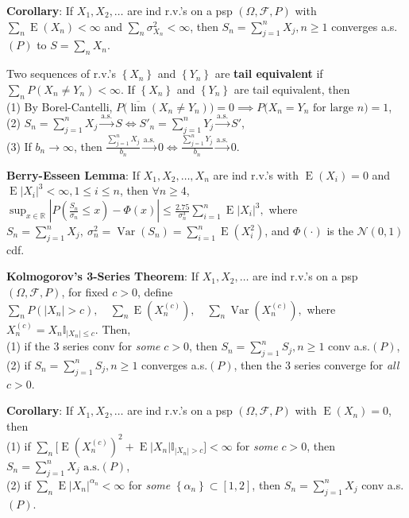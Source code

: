 \documentclass[paper=letter,fontsize=2.89mm]{scrartcl}
\DeclareMathOperator{\Var}{Var}
\DeclareMathOperator{\E}{E}
\newcommand{\convas}{\stackrel{\text{a.s.}}{\longrightarrow}}
\newcommand{\Norm}{\mathcal{N}}
\newcommand{\R}{\mathbb{R}}
\newcommand\indicate[1]{\mathbb{I}_{ #1 }}
\newcommand\abs[1]{\left| #1 \right|}
\newcommand\set[1]{\left\{ #1 \right\}}
\begin{document}
\begin{multicols*}{3}
\textbf{Corollary}: If $X_1, X_2, \dots$ are ind r.v.\@'s on a psp $(\Omega, \mathcal{F}, P)$ with $\sum_n \E(X_n) < \infty$ and $\sum_n \sigma^2_{X_n} < \infty$, then $S_n = \sum_{j=1}^n X_j, n\ge1$ converges a.s.$(P)$ to $S = \sum_n X_n$. \\\medskip

Two sequences of r.v.\@'s $\set{X_n}$ and $\set{Y_n}$ are \textbf{tail equivalent} if $\sum_n P(X_n \ne Y_n) < \infty$. If $\set{X_n}$ and $\set{Y_n}$ are tail equivalent, then \\
(1) By Borel-Cantelli, $P\big(\overline{\lim}(X_n \ne Y_n)\big) = 0 \implies P\big(X_n = Y_n \text{ for large } n\big) = 1$,  \\
(2) $S_n = \sum_{j=1}^n X_j \convas S \iff S'_n = \sum_{j=1}^n Y_j \convas S'$, \\
(3) If $b_n \to \infty$, then $\frac{\sum_{j=1}^n X_j}{b_n} \convas 0 \iff \frac{\sum_{j=1}^n Y_j}{b_n} \convas 0.$ \\ \medskip

\textbf{Berry-Esseen Lemma}: If $X_1, X_2, \dots, X_n$ are ind r.v.\@'s with $\E(X_i) = 0$ and $\E\abs{X_i}^3 < \infty, 1 \le i \le n$, then $\forall n \ge 4$,
$\sup_{x\in\R} \abs{P\left(\frac{S_n}{\sigma_n} \le x \right) - \Phi(x)} \le \frac{2.75}{\sigma^3_n}\sum_{i=1}^n \E\abs{X_i}^3,$
where $S_n = \sum_{j=1}^n X_j, ~\sigma^2_n = \Var(S_n) = \sum_{i=1}^n \E(X_i^2)$, and $\Phi(\cdot)$ is the $\Norm(0,1)$ cdf. \\ \medskip

\textbf{Kolmogorov's 3-Series Theorem}: If $X_1, X_2, \dots$ are ind r.v.\@'s on a psp $(\Omega, \mathcal{F}, P)$, for fixed $c > 0$, define
$\sum_n P(\abs{X_n} > c), \quad \sum_n \E(X_n^{(c)}), \quad \sum_n \Var(X_n^{(c)}),$
where $X_n^{(c)} = X_n \indicate{\abs{X_n} \le c}$. Then, \\
(1) if the 3 series conv for \emph{some} $c > 0$, then $S_n = \sum_{j=1}^n S_j, n\ge1$ conv a.s.$(P)$, \\
(2) if $S_n = \sum_{j=1}^n S_j, n\ge1$ converges a.s.$(P)$, then the 3 series converge for \emph{all} $c > 0$. \\ \medskip

\textbf{Corollary}: If $X_1, X_2, \dots$ are ind r.v.\@'s on a psp $(\Omega, \mathcal{F}, P)$ with $\E(X_n) = 0$, then \\
(1) if  $\sum_n\big[ \E(X_n^{(c)})^2 + \E\abs{X_n}\indicate{\abs{X_n} > c}\big] < \infty$ for \emph{some} $c > 0$, then $S_n = \sum_{j=1}^n X_j \text{ a.s.}(P)$, \\
(2) if $\sum_n \E\abs{X_n}^{\alpha_n} < \infty$ for \emph{some} $\set{\alpha_n} \subset [1,2]$, then $S_n = \sum_{j=1}^n X_j$ conv a.s.$(P)$. \\ \medskip


\end{multicols*}
\end{document}
